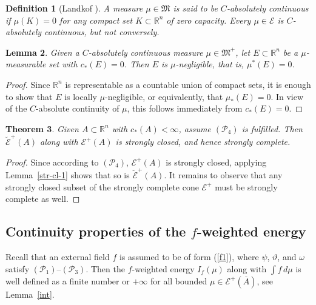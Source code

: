 \documentclass[12pt,a4paper,reqno]{amsart} %
\theoremstyle{lause}
\theoremstyle{maaritelma}
\theoremstyle{lause}
\newtheorem{theorem}{Theorem}[section]
\newtheorem{lemma}[theorem]{Lemma}
\theoremstyle{maaritelma}
\newtheorem{definition}[theorem]{Definition}
\numberwithin{equation}{section}
\begin{document}
\begin{definition}[{\rm Landkof \cite[Section~II.1.2]{L}}]
  A measure $\mu\in\mathfrak M$ is said to be {\it $C$-ab\-s\-o\-lutely continuous} if $\mu(K)=0$ for any compact set $K\subset\mathbb R^n$ of zero capacity. Every $\mu\in\mathcal E$ is $C$-absolutely continuous, but not conversely.
\end{definition}

\begin{lemma}\label{l-negl}Given a $C$-ab\-s\-o\-lutely continuous measure $\mu\in\mathfrak M^+$, let $E\subset\mathbb R^n$ be a $\mu$-mea\-sur\-ab\-le set with $c_*(E)=0$. Then $E$ is $\mu$-neg\-lig\-ible, that is, $\mu^*(E)=0$.\end{lemma}

\begin{proof}
   Since $\mathbb R^n$ is representable as a countable union of compact sets, it is enough to show that $E$ is locally $\mu$-negligible, or equivalently, that $\mu_*(E)=0$. In view of the $C$-ab\-s\-o\-lute continuity of $\mu$, this follows immediately from $c_*(E)=0$.
\end{proof}

\begin{theorem}\label{quasi-complete}
Given $A\subset\mathbb R^n$ with $c_*(A)<\infty$, assume $(\mathcal P_4)$ is fulfilled. Then $\breve{\mathcal E}^+(A)$ along with $\mathcal E^+(A)$ is strongly closed, and hence strongly complete.
\end{theorem}

\begin{proof}
Since according to $(\mathcal P_4)$, $\mathcal E^+(A)$ is strongly closed, applying Lemma~\ref{str-cl-1} shows that so is $\breve{\mathcal E}^+(A)$. It remains to observe that any strongly closed subset of the strongly complete cone $\mathcal E^+$ must be strongly complete as well.
\end{proof}

\subsection{Continuity properties of the $f$-weighted energy}\label{sec-some}
Recall that an external field $f$ is assumed to be of form (\ref{f1}), where $\psi$, $\vartheta$, and $\omega$ satisfy $(\mathcal P_1)$--$(\mathcal P_3)$. Then the $f$-weighted energy $I_f(\mu)$ along with $\int f\,d\mu$ is well defined as a finite number or $+\infty$ for all bounded $\mu\in\mathcal E^+(\overline{A})$, see Lemma~\ref{int}.
\end{document}
